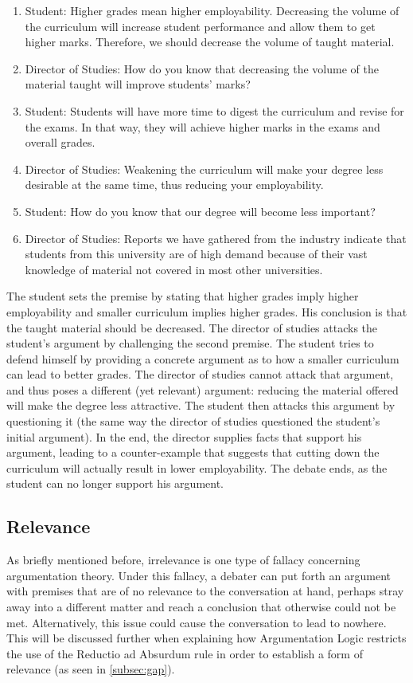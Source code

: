 \documentclass[11pt,twoside,a4paper]{report}
\begin{document}
\begin{enumerate}
\item
Student: Higher grades mean higher employability. Decreasing the volume of the curriculum will increase student performance and allow them to get higher marks. Therefore, we should decrease the volume of taught material.
\item
Director of Studies: How do you know that decreasing the volume of the material taught will improve students' marks?
\item
Student: Students will have more time to digest the curriculum and revise for the exams. In that way, they will achieve higher marks in the exams and overall grades.
\item
Director of Studies: Weakening the curriculum will make your degree less desirable at the same time, thus reducing your employability.
\item
Student: How do you know that our degree will become less important?
\item
Director of Studies: Reports we have gathered from the industry indicate that students from this university are of high demand because of their vast knowledge of material not covered in most other universities.
\end{enumerate}

The student sets the premise by stating that higher grades imply higher employability and smaller curriculum implies higher grades. His conclusion is that the taught material should be decreased. The director of studies attacks the student's argument by challenging the second premise. The student tries to defend himself by providing a concrete argument as to how a smaller curriculum can lead to better grades. The director of studies cannot attack that argument, and thus poses a different (yet relevant) argument: reducing the material offered will make the degree less attractive.  The student then attacks this argument by questioning it (the same way the director of studies questioned the student's initial argument). In the end, the director supplies facts that support his argument, leading to a counter-example that suggests that cutting down the curriculum will actually result in lower employability. The debate ends, as the student can no longer support his argument.

\subsection{Relevance}
\label{subsec:relevance}
As briefly mentioned before, irrelevance is one type of fallacy concerning argumentation theory. Under this fallacy, a debater can put forth an argument with premises that are of no relevance to the conversation at hand, perhaps stray away into a different matter and reach a conclusion that otherwise could not be met. Alternatively, this issue could cause the conversation to lead to nowhere. This will be discussed further when explaining how Argumentation Logic restricts the use of the Reductio ad Absurdum rule in order to establish a form of relevance (as seen in \autoref{subsec:gap}).
\end{document}
